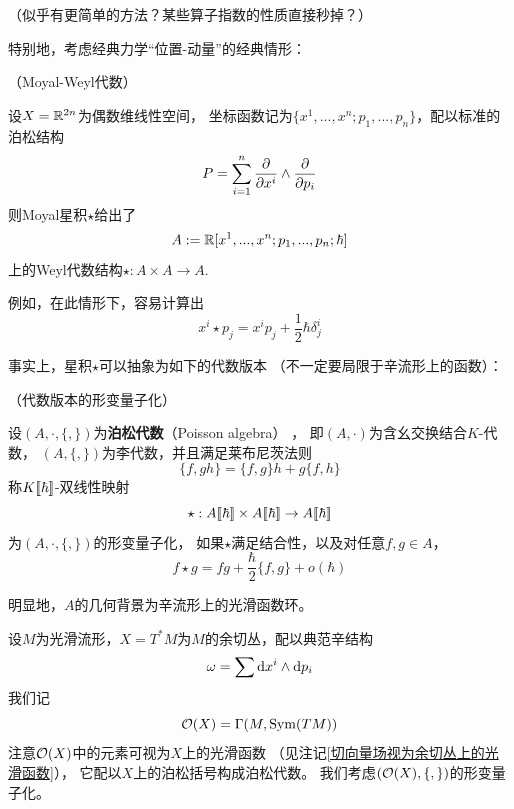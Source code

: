 {\color{blue}
（似乎有更简单的方法？某些算子指数的性质直接秒掉？）
}%

特别地，考虑经典力学“位置-动量”的经典情形：

\begin{example}（Moyal-Weyl代数）

设$X=\mathbb{R}^{2n}$为偶数维线性空间，
坐标函数记为$\{x^1,...,x^n;p_1,...,p_n\}$，配以标准的泊松结构
$$P=\sum_{i=1}^n\frac{\partial } {\partial x^i}\wedge\frac{\partial } {\partial p_i}$$
则Moyal星积$\star$给出了
$$A:=\mathbb{R}[x^1,...,x^n;p_1,...,p_n;\hbar]$$
上的Weyl代数结构$\star:A\times A\to A$.
\end{example}

例如，在此情形下，容易计算出
$$x^i\star p_j=x^ip_j+\frac{1}{2}\hbar\delta^i_j$$

事实上，星积$\star$可以抽象为如下的代数版本
（不一定要局限于辛流形上的函数）：

\begin{definition}（代数版本的形变量子化）

设$(A,\cdot,\{,\})$为\textbf{泊松代数}（Poisson algebra）
，
即$(A,\cdot)$为含幺交换结合$K$-代数，
$(A,\{,\})$为李代数，并且满足莱布尼茨法则
$$\{f,gh\}=\{f,g\}h+g\{f,h\}$$
称$K[\![\hbar]\!]$-双线性映射
$$\star :A[\![\hbar]\!]\times A[\![\hbar]\!]\to A[\![\hbar]\!]$$
为$(A,\cdot,\{,\})$的形变量子化，
如果$\star$满足结合性，以及对任意$f,g\in A$，
$$f\star g=fg+\frac{\hbar}{2}\{f,g\}+o(\hbar)$$
\end{definition}

明显地，$A$的几何背景为辛流形上的光滑函数环。

\begin{notation}
设$M$为光滑流形，$X=T^*M$为$M$的余切丛，配以典范辛结构
$$\omega=\sum\mathrm{d} x^i\wedge\mathrm{d} p_i$$
我们记
$$\mathcal{O}(X)=\Gamma(M,\operatorname{Sym}(TM))$$
注意$\mathcal{O}(X)$中的元素可视为$X$上的光滑函数
（见注记\ref{切向量场视为余切丛上的光滑函数}），
它配以$X$上的泊松括号构成泊松代数。
我们考虑$(\mathcal{O}(X),\{,\})$的形变量子化。
\end{notation}

